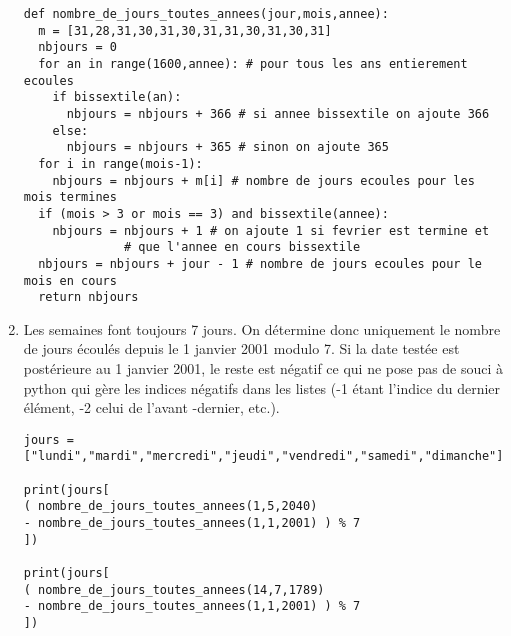 \begin{enumerate}
\begin{verbatim}
def nombre_de_jours_toutes_annees(jour,mois,annee):
  m = [31,28,31,30,31,30,31,31,30,31,30,31]
  nbjours = 0
  for an in range(1600,annee): # pour tous les ans entierement ecoules
    if bissextile(an):
      nbjours = nbjours + 366 # si annee bissextile on ajoute 366
    else:
      nbjours = nbjours + 365 # sinon on ajoute 365
  for i in range(mois-1): 
    nbjours = nbjours + m[i] # nombre de jours ecoules pour les mois termines
  if (mois > 3 or mois == 3) and bissextile(annee):
    nbjours = nbjours + 1 # on ajoute 1 si fevrier est termine et
			  # que l'annee en cours bissextile
  nbjours = nbjours + jour - 1 # nombre de jours ecoules pour le mois en cours
  return nbjours  
\end{verbatim}
 
\newpage
 \item Les semaines font toujours 7 jours. On détermine donc uniquement le nombre de jours écoulés depuis le 1 janvier 2001 modulo 7. Si la date testée est postérieure au 1 janvier 2001, le reste est négatif ce qui ne pose pas de souci à python qui gère les indices négatifs dans les listes (-1 étant l'indice du dernier élément, -2 celui de l'avant -dernier, etc.).

\begin{verbatim}
jours = ["lundi","mardi","mercredi","jeudi","vendredi","samedi","dimanche"]

print(jours[
( nombre_de_jours_toutes_annees(1,5,2040) 
- nombre_de_jours_toutes_annees(1,1,2001) ) % 7
])

print(jours[
( nombre_de_jours_toutes_annees(14,7,1789) 
- nombre_de_jours_toutes_annees(1,1,2001) ) % 7
])
\end{verbatim}

\end{enumerate}






